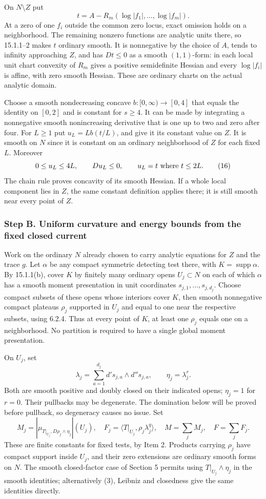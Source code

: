 \documentclass[11pt]{article}
\begin{document}
On \(N\setminus Z\) put
\[
 t=A-R_m(\log|f_1|,\ldots,\log|f_m|).
\]
At a zero of one \(f_i\) outside the common zero locus, exact omission holds on a neighborhood. The remaining nonzero functions are analytic units there, so 15.1.1--2 makes \(t\) ordinary smooth. It is nonnegative by the choice of \(A\), tends to infinity approaching \(Z\), and has \(Dt\leq0\) as a smooth \((1,1)\)-form: in each local unit chart convexity of \(R_m\) gives a positive semidefinite Hessian and every \(\log|f_i|\) is affine, with zero smooth Hessian. These are ordinary charts on the actual analytic domain.

Choose a smooth nondecreasing concave \(b:[0,\infty)\to[0,4]\) that equals the identity on \([0,2]\) and is constant for \(s\geq4\). It can be made by integrating a nonnegative smooth nonincreasing derivative that is one up to two and zero after four. For \(L\geq1\) put \(u_L=L b(t/L)\), and give it its constant value on \(Z\). It is smooth on \(N\) since it is constant on an ordinary neighborhood of \(Z\) for each fixed \(L\). Moreover
\[
 0\leq u_L\leq4L,\qquad Du_L\leq0,
 \qquad u_L=t\ \hbox{where }t\leq2L.
\tag{16}
\]
The chain rule proves concavity of its smooth Hessian. If a whole local component lies in \(Z\), the same constant definition applies there; it is still smooth near every point of \(Z\).

\subsubsection{Step B. Uniform curvature and energy bounds from the fixed closed current}

Work on the ordinary \(N\) already chosen to carry analytic equations for \(Z\) and the trace \(g\). Let \(\alpha\) be any compact symmetric detecting test there, with \(K=\operatorname{supp}\alpha\). By 15.1.1(b), cover \(K\) by finitely many ordinary opens \(U_j\subset N\) on each of which \(\alpha\) has a smooth moment presentation in unit coordinates \(s_{j,1},\ldots,s_{j,d_j}\). Choose compact subsets of these opens whose interiors cover \(K\), then smooth nonnegative compact plateaus \(\rho_j\) supported in \(U_j\) and equal to one near the respective subsets, using 6.2.4. Thus at every point of \(K\), at least one \(\rho_j\) equals one on a neighborhood. No partition is required to have a single global moment presentation.

On \(U_j\), set
\[
 \lambda_j=\sum_{a=1}^{d_j}d's_{j,a}\wedge d''s_{j,a},\qquad \eta_j=\lambda_j^r.
\]
Both are smooth positive and doubly closed on their indicated opens; \(\eta_j=1\) for \(r=0\). Their pullbacks may be degenerate. The domination below will be proved before pullback, so degeneracy causes no issue. Set
\[
 M_j=|\mu_{T|_{U_j},D\rho_j\wedge\eta_j}|(U_j),\quad
 F_j=\langle T|_{U_j},\rho_j\lambda_j^q\rangle,\quad
 M=\sum_j M_j,\quad F=\sum_j F_j.
\]
These are finite constants for fixed tests, by Item 2. Products carrying \(\rho_j\) have compact support inside \(U_j\), and their zero extensions are ordinary smooth forms on \(N\). The smooth closed-factor case of Section 5 permits using \(T|_{U_j}\wedge\eta_j\) in the smooth identities; alternatively (3), Leibniz and closedness give the same identities directly.
\end{document}
